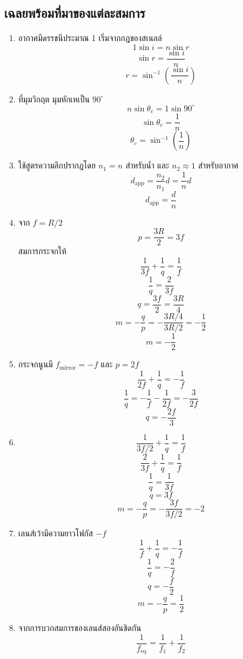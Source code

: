 \subsection*{เฉลยพร้อมที่มาของแต่ละสมการ}

\begin{enumerate}
    \item อากาศมีดรรชนีประมาณ 1 เริ่มจากกฎของสเนลล์
    \[
    1\sin i=n\sin r
    \]
    \[
    \sin r=\frac{\sin i}{n}
    \]
    \[
    \boxed{r=\sin^{-1}\left(\frac{\sin i}{n}\right)}
    \]

    \item ที่มุมวิกฤต มุมหักเหเป็น $90^\circ$
    \[
    n\sin\theta_c=1\sin90^\circ
    \]
    \[
    \sin\theta_c=\frac{1}{n}
    \]
    \[
    \boxed{\theta_c=\sin^{-1}\left(\frac{1}{n}\right)}
    \]

    \item ใช้สูตรความลึกปรากฏโดย $n_1=n$ สำหรับน้ำ และ $n_2\approx1$ สำหรับอากาศ
    \[
    d_{\text{app}}=\frac{n_2}{n_1}d
    =\frac{1}{n}d
    \]
    \[
    \boxed{d_{\text{app}}=\frac{d}{n}}
    \]

    \item จาก $f=R/2$
    \[
    p=\frac{3R}{2}=3f
    \]
    สมการกระจกให้
    \[
    \frac{1}{3f}+\frac{1}{q}=\frac{1}{f}
    \]
    \[
    \frac{1}{q}=\frac{2}{3f}
    \]
    \[
    \boxed{q=\frac{3f}{2}=\frac{3R}{4}}
    \]
    \[
    m=-\frac{q}{p}
    =-\frac{3R/4}{3R/2}
    =-\frac{1}{2}
    \]
    \[
    \boxed{m=-\frac{1}{2}}
    \]

    \item กระจกนูนมี $f_{\text{mirror}}=-f$ และ $p=2f$
    \[
    \frac{1}{2f}+\frac{1}{q}=-\frac{1}{f}
    \]
    \[
    \frac{1}{q}=-\frac{1}{f}-\frac{1}{2f}
    =-\frac{3}{2f}
    \]
    \[
    \boxed{q=-\frac{2f}{3}}
    \]

    \item
    \[
    \frac{1}{3f/2}+\frac{1}{q}=\frac{1}{f}
    \]
    \[
    \frac{2}{3f}+\frac{1}{q}=\frac{1}{f}
    \]
    \[
    \frac{1}{q}=\frac{1}{3f}
    \]
    \[
    \boxed{q=3f}
    \]
    \[
    \boxed{m=-\frac{q}{p}=-\frac{3f}{3f/2}=-2}
    \]

    \item เลนส์เว้ามีความยาวโฟกัส $-f$
    \[
    \frac{1}{f}+\frac{1}{q}=-\frac{1}{f}
    \]
    \[
    \frac{1}{q}=-\frac{2}{f}
    \]
    \[
    \boxed{q=-\frac{f}{2}}
    \]
    \[
    \boxed{m=-\frac{q}{p}=\frac{1}{2}}
    \]

    \item จากการบวกสมการของเลนส์สองอันชิดกัน
    \[
    \boxed{\frac{1}{f_{\text{eq}}}=\frac{1}{f_1}+\frac{1}{f_2}}
    \]


\end{enumerate}
